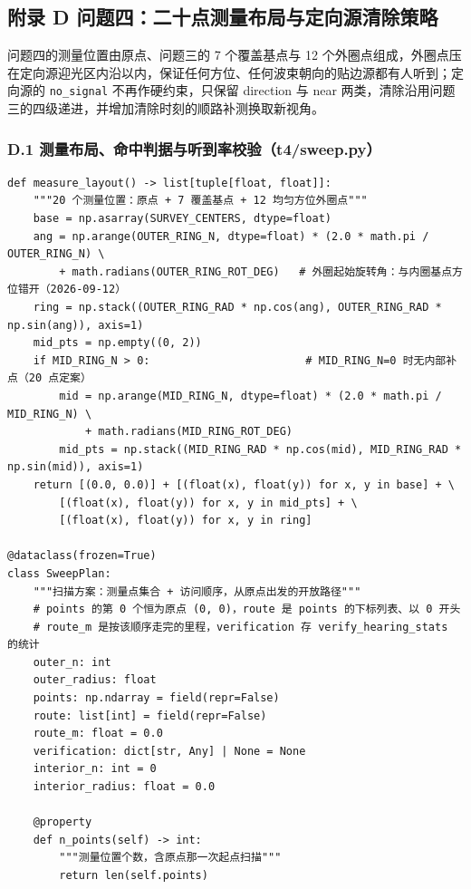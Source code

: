 \documentclass[UTF8, zihao=5,AutoFakeBold=2]{ctexart}
\begin{document}
\subsection*{附录 D \quad 问题四：二十点测量布局与定向源清除策略}

	\noindent 问题四的测量位置由原点、问题三的 7 个覆盖基点与 12 个外圈点组成，外圈点压在定向源迎光区内沿以内，保证任何方位、任何波束朝向的贴边源都有人听到；定向源的 \texttt{no\_signal} 不再作硬约束，只保留 direction 与 near 两类，清除沿用问题三的四级递进，并增加清除时刻的顺路补测换取新视角。

	\subsubsection*{D.1 \quad 测量布局、命中判据与听到率校验（t4/sweep.py）}
	\begin{lstlisting}
def measure_layout() -> list[tuple[float, float]]:
    """20 个测量位置：原点 + 7 覆盖基点 + 12 均匀方位外圈点"""
    base = np.asarray(SURVEY_CENTERS, dtype=float)
    ang = np.arange(OUTER_RING_N, dtype=float) * (2.0 * math.pi / OUTER_RING_N) \
        + math.radians(OUTER_RING_ROT_DEG)   # 外圈起始旋转角：与内圈基点方位错开（2026-09-12）
    ring = np.stack((OUTER_RING_RAD * np.cos(ang), OUTER_RING_RAD * np.sin(ang)), axis=1)
    mid_pts = np.empty((0, 2))
    if MID_RING_N > 0:                        # MID_RING_N=0 时无内部补点（20 点定案）
        mid = np.arange(MID_RING_N, dtype=float) * (2.0 * math.pi / MID_RING_N) \
            + math.radians(MID_RING_ROT_DEG)
        mid_pts = np.stack((MID_RING_RAD * np.cos(mid), MID_RING_RAD * np.sin(mid)), axis=1)
    return [(0.0, 0.0)] + [(float(x), float(y)) for x, y in base] + \
        [(float(x), float(y)) for x, y in mid_pts] + \
        [(float(x), float(y)) for x, y in ring]

@dataclass(frozen=True)
class SweepPlan:
    """扫描方案：测量点集合 + 访问顺序，从原点出发的开放路径"""
    # points 的第 0 个恒为原点 (0, 0)，route 是 points 的下标列表、以 0 开头
    # route_m 是按该顺序走完的里程，verification 存 verify_hearing_stats 的统计
    outer_n: int
    outer_radius: float
    points: np.ndarray = field(repr=False)
    route: list[int] = field(repr=False)
    route_m: float = 0.0
    verification: dict[str, Any] | None = None
    interior_n: int = 0
    interior_radius: float = 0.0

    @property
    def n_points(self) -> int:
        """测量位置个数，含原点那一次起点扫描"""
        return len(self.points)


\end{lstlisting}
\end{document}
